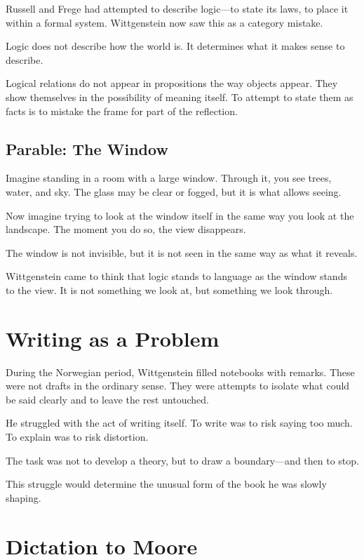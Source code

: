 \documentclass[11pt]{article}
\begin{document}
Russell and Frege had attempted to describe logic—to state its laws, to place it within a formal system. Wittgenstein now saw this as a category mistake.

Logic does not describe how the world is. It determines what it makes sense to describe.

Logical relations do not appear in propositions the way objects appear. They show themselves in the possibility of meaning itself. To attempt to state them as facts is to mistake the frame for part of the reflection.

\subsection*{Parable: The Window}

Imagine standing in a room with a large window. Through it, you see trees, water, and sky. The glass may be clear or fogged, but it is what allows seeing.

Now imagine trying to look at the window itself in the same way you look at the landscape. The moment you do so, the view disappears.

The window is not invisible, but it is not seen in the same way as what it reveals.

Wittgenstein came to think that logic stands to language as the window stands to the view. It is not something we look at, but something we look through.

\section*{Writing as a Problem}

During the Norwegian period, Wittgenstein filled notebooks with remarks. These were not drafts in the ordinary sense. They were attempts to isolate what could be said clearly and to leave the rest untouched.

He struggled with the act of writing itself. To write was to risk saying too much. To explain was to risk distortion.

The task was not to develop a theory, but to draw a boundary—and then to stop.

This struggle would determine the unusual form of the book he was slowly shaping.

\section*{Dictation to Moore}
\end{document}
